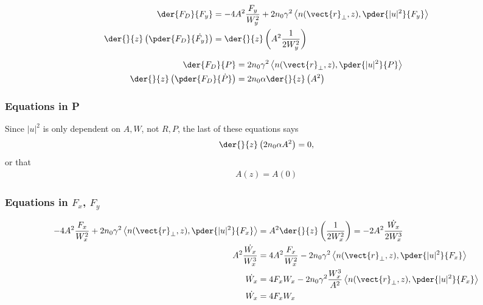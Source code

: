 \begin{equation}
\begin{split}
    \der{F_{D}}{F_y}  &=  - 4 A^2 \frac{F_{y}}{W_{y}^2} + 2n_0 \gamma^2 \left<n(\vect{r}_{\perp},z),\pder{|u|^2}{F_y}\right> \\
    \der{}{z}\left(\pder{F_{D}}{\dot{F_y}}\right) &= \der{}{z}\left(A^2 \frac{1}{2W_{y}^2} \right)
\end{split}
\end{equation}

\begin{equation}
\begin{split}
    \der{F_{D}}{P}  &= 2n_0 \gamma^2 \left< n(\vect{r}_{\perp},z),\pder{|u|^2}{P}  \right> \\
\der{}{z}\left(\pder{F_{D}}{\dot{P}}\right) &= 2 n_0 \alpha \der{}{z}\left(A^2 \right)  
\end{split}
\end{equation}


\subsubsection{Equations in P}
Since $|u|^2$ is only dependent on $A,W$, not $R,P$, the last of these equations says
\begin{equation}
\begin{split}
    \der{}{z}\left( 2 n_0 \alpha A^2 \right) = 0,
\end{split}
\end{equation}
or that
\begin{equation}
\begin{split}
    A(z) = A(0)
\end{split}
\end{equation}


\subsubsection{Equations in $F_x$, $F_y$}

\begin{equation}
\begin{split}
    - 4 A^2 \frac{F_{x}}{W_{x}^2} + 2n_0 \gamma^2 \left<n(\vect{r}_{\perp},z),\pder{|u|^2}{F_x}\right> &= A^2  \der{}{z}\left(\frac{1}{2W_{x}^2} \right) = -2 A^2 \frac{\dot{W_{x}}}{2W_{x}^3} \\
      A^2 \frac{\dot{W_{x}}}{W_{x}^3} &= 4 A^2 \frac{F_{x}}{W_{x}^2} - 2n_0 \gamma^2 \left<n(\vect{r}_{\perp},z),\pder{|u|^2}{F_x}\right>\\
     \dot{W_{x}} &= 4 F_{x}W_{x} - 2n_0 \gamma^2 \frac{W_{x}^3}{A^2} \left<n(\vect{r}_{\perp},z),\pder{|u|^2}{F_x}\right> \\
     \dot{W_{x}} &= 4 F_{x}W_{x}
    \end{split}
\end{equation}

